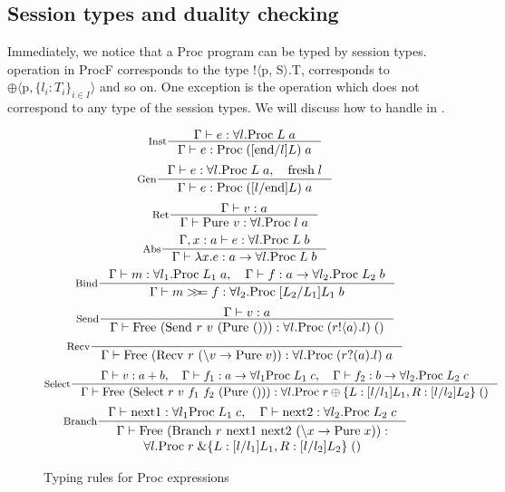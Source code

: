 \subsection{Session types and duality checking} \label{spar:sec:session-typing}
Immediately, we notice that a Proc program can be typed by session types.  operation in ProcF corresponds to the type !$\langle$p, S$\rangle$.T,  corresponds to $\oplus \langle \text{p}, \{ l_i : T_i \}_{i \in I} \rangle$ and so on. One exception is the  operation which does not correspond to any type of the session types. We will discuss how to handle  in . 

\begin{figure}[ht]
    \[
        \inference[Inst]{\Gamma \vdash e : \forall l. \text{Proc} \; L \; a}{\Gamma \vdash e : \text{Proc} \; ([\text{end}/l]L) \; a}
    \]
    \[
        \inference[Gen]{\Gamma \vdash e : \forall l. \text{Proc} \; L \; a, \quad \text{fresh} \; l}{\Gamma \vdash e : \text{Proc} \; ([l/\text{end}]L) \; a}
    \]
    \[
        \inference[Ret]{\Gamma |- v : a}{\Gamma |- \text{Pure $v$} : \forall l. \text{Proc} \; l \; a}
    \]
    \[
        \inference[Abs]{\Gamma, x : a |- e : \forall l. \text{Proc} \; L \; b}{\Gamma |- \lambda x. e : a \rightarrow \forall l. \text{Proc} \; L \; b}
    \]
    \[\inference[Bind]{\Gamma |- m : \forall l_1. \Mp{L_1}{a}, \quad \Gamma |- f : a \rightarrow \forall l_2. \Mp{L_2}{b}}{\Gamma |- m >\!\!>\!\!= f : \forall l_2. \Mp{[L_2/L_1]L_1}{b}}\]
    \[\inference[Send]{\Gamma |- v : a}{\Gamma |- \text{Free (Send $r$ $v$ (Pure $()$))} : \forall l. \Mp{(r!\langle a \rangle.l)}{()}}\]
    \[\inference[Recv]{}{\Gamma |- \text{Free (Recv $r$ $(\backslash v -> \text{Pure} \; v)$)} : \forall l. \Mp{(r?(a).l)}{a}}\]
    \[\inference[Select]{\Gamma |- v : a + b, \quad \Gamma |- f_1 : a \rightarrow \forall l_1 \Mp{L_1}{c}, \quad \Gamma |- f_2 : b \rightarrow \forall l_2. \Mp{L_2}{c}}{\Gamma |- \text{Free (Select $r$ $v$ $f_1$ $f_2$ (Pure $()$))} : \forall l. \Mp{r \oplus \{ L : [l/l_1]L_1, R: [l/l_2]L_2\}}{()}}\]
    \[\inference[Branch]{\Gamma |- \text{next1} : \forall l_1 \Mp{L_1}{c}, \quad \Gamma |- \text{next2} : \forall l_2. \Mp{L_2}{c}}
    {
        \begin{array}{@{}c@{}}
        \Gamma |- \text{Free (Branch $r$ next1 next2 ($\backslash x \rightarrow \text{Pure}\; x$))} : \\ \forall l. \Mp{r \; \& \{ L : [l/l_1]L_1, R: [l/l_2]L_2\}}{()}
        \end{array}
    }\]
    \caption{Typing rules for Proc expressions}
    \label{spar:styperule}
\end{figure}

